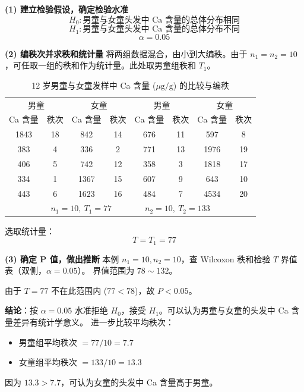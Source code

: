 \documentclass[lang=cn,10pt]{elegantbook}
\begin{document}
\vspace{0.2cm}
\begin{solution}
\textbf{(1) 建立检验假设，确定检验水准}
\[
H_0: \text{男童与女童头发中 Ca 含量的总体分布相同}
\]
\[
H_1: \text{男童与女童头发中 Ca 含量的总体分布不同}
\]
\[
\alpha = 0.05
\]

\textbf{(2) 编秩次并求秩和统计量}
将两组数据混合，由小到大编秩。由于 $n_1 = n_2 = 10$，可任取一组的秩和作为统计量。此处取男童组秩和 $T_1$。

\begin{table}[htbp]
\centering
\caption{12 岁男童与女童发样中 Ca 含量 ($\mu\mathrm{g}/\mathrm{g}$) 的比较与编秩}
\begin{tabular}{cccc|cccc}
\toprule
\multicolumn{2}{c}{男童} & \multicolumn{2}{c|}{女童} & \multicolumn{2}{c}{男童} & \multicolumn{2}{c}{女童} \\
Ca 含量 & 秩次 & Ca 含量 & 秩次 & Ca 含量 & 秩次 & Ca 含量 & 秩次 \\
\midrule
1843 & 18 & 842  & 14 & 676 & 11 & 597  & 8  \\
383  & 4  & 336  & 2  & 771 & 13 & 1976 & 19 \\
406  & 5  & 742  & 12 & 358 & 3  & 1818 & 17 \\
334  & 1  & 1367 & 15 & 607 & 9  & 643  & 10 \\
443  & 6  & 1623 & 16 & 484 & 7  & 4534 & 20 \\
\midrule
\multicolumn{8}{c}{$n_1=10,\ T_1=77 \qquad \qquad n_2=10,\ T_2=133$} \\
\bottomrule
\end{tabular}
\end{table}

选取统计量：
\[
T = T_1 = 77
\]

\textbf{(3) 确定 P 值，做出推断}
本例 $n_1=10, n_2=10$，查 Wilcoxon 秩和检验 $T$ 界值表（双侧，$\alpha=0.05$）。
界值范围为 $78 \sim 132$。

由于 $T=77$ 不在此范围内 ($77 < 78$)，故 $P < 0.05$。

\textbf{结论}：按 $\alpha=0.05$ 水准拒绝 $H_0$，接受 $H_1$。可以认为男童与女童的头发中 Ca 含量差异有统计学意义。
进一步比较平均秩次：
\begin{itemize}
    \item 男童组平均秩次 $= 77/10 = 7.7$
    \item 女童组平均秩次 $= 133/10 = 13.3$
\end{itemize}

因为 $13.3 > 7.7$，可认为女童的头发中 Ca 含量高于男童。
\end{solution}
\end{document}
